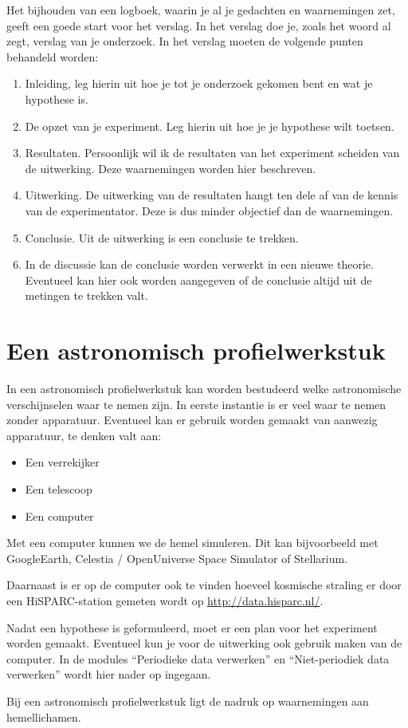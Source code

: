 Het bijhouden van een logboek, waarin je al je gedachten en waarnemingen
zet, geeft een goede start voor het verslag. In het verslag doe je,
zoals het woord al zegt, verslag van je onderzoek. In het verslag
moeten de volgende punten behandeld worden:
\begin{enumerate}
\item Inleiding, leg hierin uit hoe je tot je onderzoek gekomen bent en
wat je hypothese is.
\item De opzet van je experiment. Leg hierin uit hoe je je hypothese wilt
toetsen.
\item Resultaten. Persoonlijk wil ik de resultaten van het experiment scheiden
van de uitwerking. Deze waarnemingen worden hier beschreven.
\item Uitwerking. De uitwerking van de resultaten hangt ten dele af van
de kennis van de experimentator. Deze is dus minder objectief dan
de waarnemingen.
\item Conclusie. Uit de uitwerking is een conclusie te trekken.
\item In de discussie kan de conclusie worden verwerkt in een nieuwe theorie.
Eventueel kan hier ook worden aangegeven of de conclusie altijd uit
de metingen te trekken valt.
\end{enumerate}

\section{Een astronomisch profielwerkstuk}

In een astronomisch profielwerkstuk kan worden bestudeerd welke astronomische
verschijnselen waar te nemen zijn. In eerste instantie is er veel
waar te nemen zonder apparatuur. Eventueel kan er gebruik worden gemaakt
van aanwezig apparatuur, te denken valt aan:
\begin{itemize}
\item Een verrekijker
\item Een telescoop
\item Een computer
\end{itemize}
Met een computer kunnen we de hemel simuleren. Dit kan bijvoorbeeld
met GoogleEarth, Celestia / OpenUniverse Space Simulator of Stellarium.

Daarnaast is er op de computer ook te vinden hoeveel kosmische straling
er door een HiSPARC-station gemeten wordt op \url{http://data.hisparc.nl/}.

Nadat een hypothese is geformuleerd, moet er een plan voor het experiment
worden gemaakt. Eventueel kun je voor de uitwerking ook gebruik maken
van de computer. In de modules ``Periodieke data verwerken'' en
``Niet-periodiek data verwerken'' wordt hier nader op ingegaan.

Bij een astronomisch profielwerkstuk ligt de nadruk op waarnemingen
aan hemellichamen.


